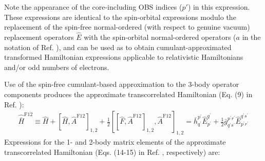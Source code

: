 \documentclass[aip,onecolumn,preprint]{revtex4-1}
\begin{document}
Note the appearance of the core-including OBS indices ($p'$) in this expression.
These expressions are identical to the spin-orbital expressions modulo the replacement of the spin-free normal-ordered (with respect to genuine vacuum) replacement operators $\hat{E}$ with the spin-orbital normal-ordered operators ($a$ in the notation of Ref. ), and can be used as to obtain cumulant-approximated transformed Hamiltonian expressions applicable to relativistic Hamiltonians and/or odd numbers of electrons.

Use of the spin-free cumulant-based approximation to the 3-body operator components produces the approximate transcorrelated Hamiltonian (Eq. (9) in Ref. ):
\begin{align}
\label{eq:H-approx}
\hat{\bar{H}}^\mathrm{F12} \equiv \hat{H} + [\hat{H}, \hat{A}^\mathrm{F12}]_{1,2} + \frac{1}{2} [[\hat{F}, \hat{A}^\mathrm{F12}]_{1,2}, \hat{A}^\mathrm{F12}]_{1,2} = \bar{h}^{p^\prime}_{q^\prime} \hat{E}^{q^\prime}_{p^\prime} + \frac{1}{2}\bar{g}^{p^\prime r^\prime}_{q^\prime s^\prime } \hat{E}^{q^\prime s^\prime}_{p^\prime r^\prime} 
\end{align}
Expressions for the 1- and 2-body matrix elements of the approximate transcorrelated Hamiltonian (Eqs. (14-15) in Ref. , respectively) are:
\end{document}
